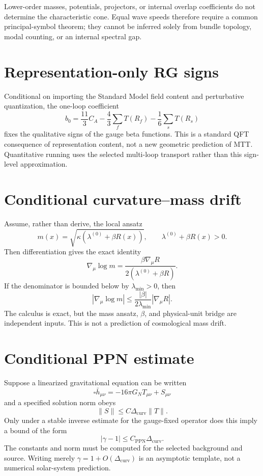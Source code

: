 \documentclass[11pt]{article}
\begin{document}
Lower-order masses, potentials, projectors, or internal overlap coefficients do
not determine the characteristic cone. Equal wave speeds therefore require a
common principal-symbol theorem; they cannot be inferred solely from bundle
topology, modal counting, or an internal spectral gap.

\section{Representation-only RG signs}

Conditional on importing the Standard Model field content and perturbative
quantization, the one-loop coefficient
\[
b_0=\frac{11}{3}C_A-\frac{4}{3}\sum_fT(R_f)
-\frac{1}{6}\sum_sT(R_s)
\]
fixes the qualitative signs of the gauge beta functions. This is a standard
QFT consequence of representation content, not a new geometric prediction of
MTT. Quantitative running uses the selected multi-loop transport rather than
this sign-level approximation.

\section{Conditional curvature--mass drift}

Assume, rather than derive, the local ansatz
\[
m(x)=\sqrt{\kappa(\lambda^{(0)}+\beta R(x))},
\qquad \lambda^{(0)}+\beta R(x)>0.
\]
Then differentiation gives the exact identity
\[
\nabla_\mu\log m
=\frac{\beta\nabla_\mu R}{2(\lambda^{(0)}+\beta R)}.
\]
If the denominator is bounded below by $\lambda_{\min}>0$, then
\[
|\nabla_\mu\log m|
\leq\frac{|\beta|}{2\lambda_{\min}}|\nabla_\mu R|.
\]
The calculus is exact, but the mass ansatz, $\beta$, and physical-unit bridge
are independent inputs. This is not a prediction of cosmological mass drift.

\section{Conditional PPN estimate}

Suppose a linearized gravitational equation can be written
\[
\square\bar h_{\mu\nu}=-16\pi G_NT_{\mu\nu}+S_{\mu\nu}
\]
and a specified solution norm obeys
\[
\|S\|\leq C\Delta_{\mathrm{curv}}\|T\|.
\]
Only under a stable inverse estimate for the gauge-fixed operator does this
imply a bound of the form
\[
|\gamma-1|\leq C_{\mathrm{PPN}}\Delta_{\mathrm{curv}}.
\]
The constants and norm must be computed for the selected background and source.
Writing merely $\gamma=1+O(\Delta_{\mathrm{curv}})$ is an asymptotic template,
not a numerical solar-system prediction.
\end{document}
